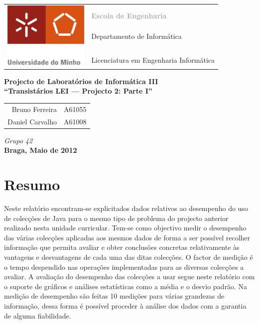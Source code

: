 \documentclass[a5paper,twocolumn, 11pt]{article}
\begin{document}
\onecolumn
\thispagestyle{empty}
\begin{tabular}{ll}
    \multirow{7}{*}{ \includegraphics[height=90pt]{logo.jpeg} }
    &\\
    & \textcolor{DarkGray}{\Large{\textbf{Escola de Engenharia}}} \\
    &\\
    & \large{Departamento de Informática}\\
    &\\
    &\\
    & \large{Licenciatura em Engenharia Informática}\\
\end{tabular}
\begin{center}
    \Large{\textbf{Projecto de Laboratórios de Informática III}}\\
    \vspace{20pt}
    \Large{\textbf{``Transistários LEI --- Projecto 2: Parte I''}}\\
    \vspace{15pt}
    \begin{tabular}{r@{, }l}
        Bruno Ferreira&A61055\\
        Daniel Carvalho&A61008\\
    \end{tabular}
    
    \vspace{5pt}
    \emph{Grupo 42}\\\vspace{15pt}
    \large{\textbf{Braga, Maio de 2012}}
\end{center}

\newpage
\twocolumn
\tableofcontents
\newpage
\listoffigures

\newpage
\section{Resumo}
Neste relatório encontram-se explicitados dados relativos ao desempenho do uso de colecções de Java para o mesmo tipo de problema do projecto anterior realizado nesta unidade curricular. Tem-se como objectivo medir o desempenho das várias colecções aplicadas aos mesmos dados de forma a ser possível recolher informação que permita avaliar e obter conclusões concretas relativamente às vantagens e desvantagens de cada uma das ditas colecções. O factor de medição é o tempo despendido nas operações implementadas para as diversas colecções a avaliar. A avaliação do desempenho das colecções a usar segue neste relatório com o suporte de gráficos e análises estatísticas como a média e o desvio padrão.
Na medição de desempenho são feitas 10 medições para várias grandezas de informação, dessa forma é possível proceder à análise dos dados com a garantia de alguma fiabilidade.
\end{document}
